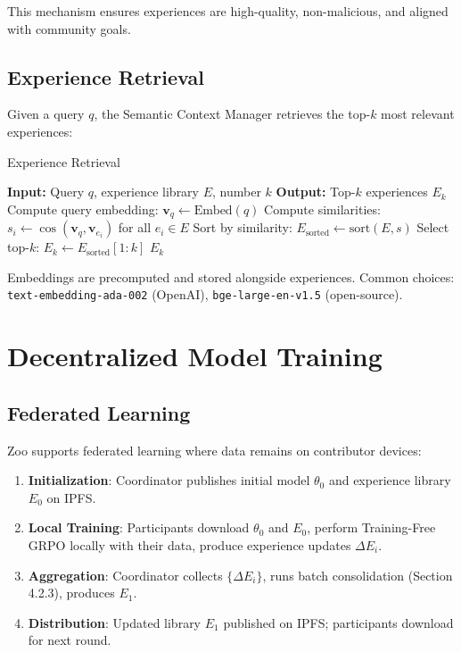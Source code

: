 \documentclass[11pt,a4paper]{article}
\begin{document}
This mechanism ensures experiences are high-quality, non-malicious, and aligned with community goals.

\subsection{Experience Retrieval}

Given a query $q$, the Semantic Context Manager retrieves the top-$k$ most relevant experiences:

\begin{algorithm}[H]
\caption{Experience Retrieval}
\begin{algorithmic}[1]
\STATE \textbf{Input:} Query $q$, experience library $E$, number $k$
\STATE \textbf{Output:} Top-$k$ experiences $E_k$
\STATE Compute query embedding: $\mathbf{v}_q \leftarrow \text{Embed}(q)$
\STATE Compute similarities: $s_i \leftarrow \cos(\mathbf{v}_q, \mathbf{v}_{e_i})$ for all $e_i \in E$
\STATE Sort by similarity: $E_{\text{sorted}} \leftarrow \text{sort}(E, s)$
\STATE Select top-$k$: $E_k \leftarrow E_{\text{sorted}}[1:k]$
\RETURN $E_k$
\end{algorithmic}
\end{algorithm}

Embeddings are precomputed and stored alongside experiences. Common choices: \texttt{text-embedding-ada-002} (OpenAI), \texttt{bge-large-en-v1.5} (open-source).

\section{Decentralized Model Training}

\subsection{Federated Learning}

Zoo supports federated learning \cite{mcmahan2017federated} where data remains on contributor devices:

\begin{enumerate}
\item \textbf{Initialization}: Coordinator publishes initial model $\theta_0$ and experience library $E_0$ on IPFS.
\item \textbf{Local Training}: Participants download $\theta_0$ and $E_0$, perform Training-Free GRPO locally with their data, produce experience updates $\Delta E_i$.
\item \textbf{Aggregation}: Coordinator collects $\{\Delta E_i\}$, runs batch consolidation (Section 4.2.3), produces $E_1$.
\item \textbf{Distribution}: Updated library $E_1$ published on IPFS; participants download for next round.
\end{enumerate}
\end{document}
